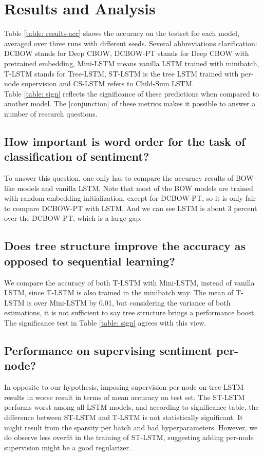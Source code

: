 \section{Results and Analysis}
\label{sec: results}
Table \ref{table: results-acc} shows the accuracy on the testset for each model,
averaged over three runs with different seeds. Several abbreviations
clarification: DCBOW stands for Deep CBOW, DCBOW-PT stands for Deep CBOW with
pretrained embedding, Mini-LSTM means vanilla LSTM trained with minibatch,
T-LSTM stands for Tree-LSTM, ST-LSTM is the tree LSTM trained with per-node
supervision and CS-LSTM refers to Child-Sum LSTM. \\ Table \ref{table: sign}
reflects the significance of these predictions when compared to another model.
The [conjunction] of these metrics makes it possible to answer a number of
research questions. \\
    \vspace{-20pt}
    \subsection{How important is word order for the task of classification of
    sentiment?} To answer this question, one only has to compare the accuracy
    results of BOW-like models and vanilla LSTM. Note that most of the BOW
    models are trained with random embedding initialization, except for
    DCBOW-PT, so it is only fair to compare DCBOW-PT with LSTM. And we can see
    LSTM is about 3 percent over the DCBOW-PT, which is a large gap.
    \vspace{-7pt}
    \subsection{Does tree structure improve the accuracy as opposed to
    sequential learning?} We compare the accuracy of both T-LSTM with Mini-LSTM,
    instead of vanilla LSTM, since T-LSTM is also trained in the minibatch way.
    The mean of T-LSTM is over Mini-LSTM by 0.01, but considering the variance
    of both estimations, it is not sufficient to say tree structure brings a
    performance boost. The significance test in Table \ref{table: sign} agrees
    with this view.
    \vspace{-7pt}
    \subsection{Performance on supervising sentiment per-node?} 
    In opposite to our hypothesis, imposing supervision per-node on tree LSTM
    results in worse result in terms of mean accuracy on test set. The ST-LSTM
    performs worst among all LSTM models, and according to significance table,
    the difference between ST-LSTM and T-LSTM is not statistically significant.
    It might result from the sparsity per batch and bad hyperparameters.
    However, we do observe less overfit in the training of ST-LSTM, suggesting
    adding per-node supervision might be a good regularizer.
    \vspace{-7pt}
